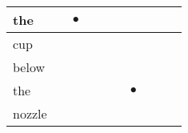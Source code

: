 \documentclass[landscape]{article}
\newcommand{\ssp}{\hspace{2pt}}
\newcommand{\mex}{\cellcolor{g}$\bullet$}
\begin{document}
\begin{tabular}{|l|p{10pt}|p{10pt}|p{10pt}|p{10pt}|p{10pt}|p{10pt}|p{10pt}|p{10pt}|p{10pt}|}
\hline
\ssp \cellcolor{ref1}the \ssp&\hspace{2pt}&\hspace{2pt}\mex&\hspace{2pt}&\hspace{2pt}&\hspace{2pt}&\hspace{2pt}&\hspace{2pt}&\hspace{2pt}&\hspace{2pt}\\
\hline
\ssp cup \ssp&\hspace{2pt}&\hspace{2pt}&\hspace{2pt}&\hspace{2pt}&\hspace{2pt}&\hspace{2pt}&\hspace{2pt}&\hspace{2pt}&\hspace{2pt}\\
\hline
\ssp below \ssp&\hspace{2pt}&\hspace{2pt}&\hspace{2pt}&\hspace{2pt}&\hspace{2pt}&\hspace{2pt}&\hspace{2pt}&\hspace{2pt}&\hspace{2pt}\\
\hline
\ssp \cellcolor{ref5}the \ssp&\hspace{2pt}&\hspace{2pt}&\hspace{2pt}&\hspace{2pt}&\hspace{2pt}&\hspace{2pt}\mex&\hspace{2pt}&\hspace{2pt}&\hspace{2pt}\\
\hline
\ssp nozzle \ssp&\hspace{2pt}&\hspace{2pt}&\hspace{2pt}&\hspace{2pt}&\hspace{2pt}&\hspace{2pt}&\hspace{2pt}&\hspace{2pt}&\hspace{2pt}\\

\end{tabular}
\end{document}
